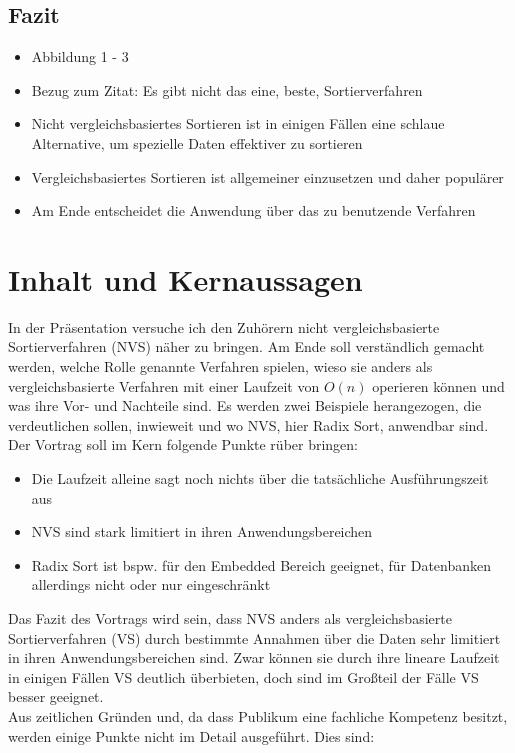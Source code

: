 \documentclass[a4paper, 12pt, oneside]{article}
\begin{document}
    \subsection{Fazit}

   \begin{itemize}
        \item Abbildung 1 - 3
        \item Bezug zum Zitat: Es gibt nicht das eine, beste, Sortierverfahren
        \item Nicht vergleichsbasiertes Sortieren ist in einigen Fällen eine schlaue Alternative, um spezielle Daten effektiver zu sortieren
        \item Vergleichsbasiertes Sortieren ist allgemeiner einzusetzen und daher populärer
        \item Am Ende entscheidet die Anwendung über das zu benutzende Verfahren
    \end{itemize}


    \clearpage
    \section{Inhalt und Kernaussagen}

    In der Präsentation versuche ich den Zuhörern nicht vergleichsbasierte Sortierverfahren (NVS)
    näher zu bringen. Am Ende soll verständlich gemacht werden, welche Rolle genannte Verfahren 
    spielen, wieso sie anders als vergleichsbasierte Verfahren mit einer Laufzeit von $O(n)$ operieren 
    können und was ihre Vor- und Nachteile sind. Es werden zwei Beispiele herangezogen, die verdeutlichen 
    sollen, inwieweit und wo NVS, hier Radix Sort, anwendbar sind. \\

    Der Vortrag soll im Kern folgende Punkte rüber bringen:

    \begin{itemize}
        \item Die Laufzeit alleine sagt noch nichts über die tatsächliche Ausführungszeit aus
        \item NVS sind stark limitiert in ihren Anwendungsbereichen
        \item Radix Sort ist bspw. für den Embedded Bereich geeignet, für Datenbanken allerdings nicht oder nur eingeschränkt
    \end{itemize}

    Das Fazit des Vortrags wird sein, dass NVS anders als vergleichsbasierte Sortierverfahren (VS) 
    durch bestimmte Annahmen über die Daten sehr limitiert in ihren Anwendungsbereichen sind. 
    Zwar können sie durch ihre lineare Laufzeit in einigen Fällen VS deutlich überbieten, 
    doch sind im Großteil der Fälle VS besser geeignet. \\
    Aus zeitlichen Gründen und, da dass Publikum eine fachliche Kompetenz besitzt, werden einige 
    Punkte nicht im Detail ausgeführt. Dies sind:
\end{document}
